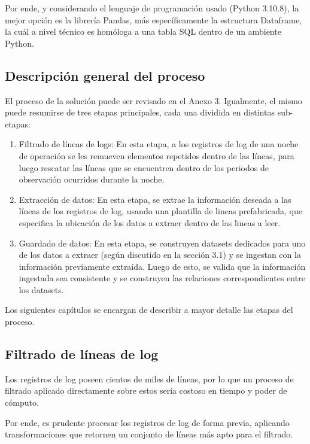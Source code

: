 Por ende, y considerando el lenguaje de programación usado (Python 3.10.8), la mejor opción es la librería Pandas, más específicamente la estructura Dataframe, la cuál a nivel técnico es homóloga a una tabla SQL dentro de un ambiente Python.

\subsection{Descripción general del proceso}

El proceso de la solución puede ser revisado en el Anexo 3. Igualmente, el mismo puede resumirse de tres etapas principales, cada una dividida en distintas sub-etapas: 

\begin{enumerate}
    \item Filtrado de líneas de logs:
    En esta etapa, a los registros de log de una noche de operación se les remueven elementos repetidos dentro de las líneas, para luego rescatar las líneas que se encuentren dentro de los periodos de observación ocurridos durante la noche.

    \item Extracción de datos:
    En esta etapa, se extrae la información deseada a las líneas de los registros de log, usando una plantilla de lineas prefabricada, que especifica la ubicación de los datos a extraer dentro de las lineas a leer.

    \item Guardado de datos:
    En esta etapa, se construyen datasets dedicados para uno de los datos a extraer (según discutido en la sección 3.1)  y se ingestan con la información previamente extraída. Luego de esto, se valida que la información ingestada sea consistente y se construyen las relaciones correspondientes entre los datasets.
\end{enumerate}

Los siguientes capítulos se encargan de describir a mayor detalle las etapas del proceso.

\subsection{Filtrado de líneas de log}

Los registros de log poseen cientos de miles de líneas, por lo que un proceso de filtrado aplicado directamente sobre estos sería costoso en tiempo y poder de cómputo.

Por ende, es prudente procesar los registros de log de forma previa, aplicando transformaciones que retornen un conjunto de líneas más apto para el filtrado.

